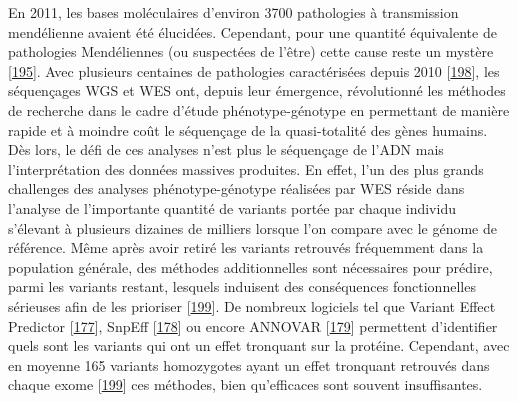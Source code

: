 \documentclass[12pt,a4paper,twoside]{ugathesis}
\theoremstyle{definition}
\theoremstyle{definition}
\theoremstyle{definition}
\theoremstyle{remark}
\begin{document}
En 2011, les bases moléculaires d'environ 3700 pathologies à
transmission mendélienne avaient été élucidées. Cependant, pour une
quantité équivalente de pathologies Mendéliennes (ou suspectées de
l'être) cette cause reste un mystère
{[}\protect\hyperlink{ref-Amberger2011}{195}{]}. Avec plusieurs
centaines de pathologies caractérisées depuis 2010
{[}\protect\hyperlink{ref-Ng}{198}{]}, les séquençages WGS et WES ont,
depuis leur émergence, révolutionné les méthodes de recherche dans le
cadre d'étude phénotype-génotype en permettant de manière rapide et à
moindre coût le séquençage de la quasi-totalité des gènes humains. Dès
lors, le défi de ces analyses n'est plus le séquençage de l'ADN mais
l'interprétation des données massives produites. En effet, l'un des plus
grands challenges des analyses phénotype-génotype réalisées par WES
réside dans l'analyse de l'importante quantité de variants portée par
chaque individu s'élevant à plusieurs dizaines de milliers lorsque l'on
compare avec le génome de référence. Même après avoir retiré les
variants retrouvés fréquemment dans la population générale, des méthodes
additionnelles sont nécessaires pour prédire, parmi les variants
restant, lesquels induisent des conséquences fonctionnelles sérieuses
afin de les prioriser {[}\protect\hyperlink{ref-Pelak2010}{199}{]}. De
nombreux logiciels tel que Variant Effect Predictor
{[}\protect\hyperlink{ref-McLaren2016}{177}{]}, SnpEff
{[}\protect\hyperlink{ref-Cingolani2012}{178}{]} ou encore ANNOVAR
{[}\protect\hyperlink{ref-Wang2010}{179}{]} permettent d'identifier
quels sont les variants qui ont un effet tronquant sur la protéine.
Cependant, avec en moyenne 165 variants homozygotes ayant un effet
tronquant retrouvés dans chaque exome
{[}\protect\hyperlink{ref-Pelak2010}{199}{]} ces méthodes, bien
qu'efficaces sont souvent insuffisantes.
\end{document}
